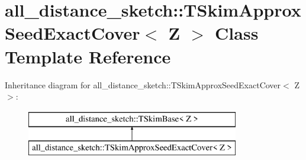 \hypertarget{classall__distance__sketch_1_1TSkimApproxSeedExactCover}{}\section{all\+\_\+distance\+\_\+sketch\+:\+:T\+Skim\+Approx\+Seed\+Exact\+Cover$<$ Z $>$ Class Template Reference}
\label{classall__distance__sketch_1_1TSkimApproxSeedExactCover}
Inheritance diagram for all\+\_\+distance\+\_\+sketch\+:\+:T\+Skim\+Approx\+Seed\+Exact\+Cover$<$ Z $>$\+:\begin{figure}[H]
\begin{center}
\leavevmode
\includegraphics[height=2.000000cm]{classall__distance__sketch_1_1TSkimApproxSeedExactCover}
\end{center}
\end{figure}
